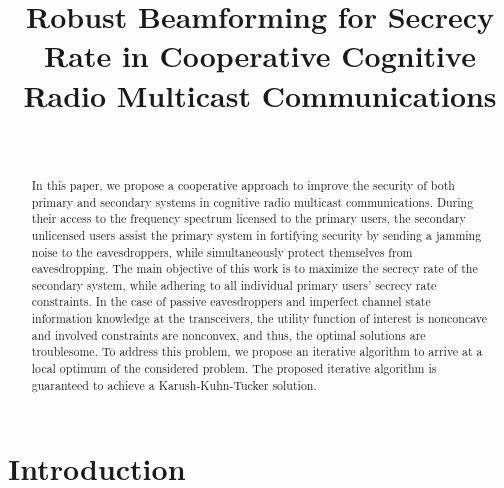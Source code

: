 \documentclass[journal,twoside]{IEEEtran}
\begin{document}
\title{ Robust Beamforming for Secrecy Rate in Cooperative Cognitive Radio Multicast Communications}
\author{
 \\

}
\maketitle
\thispagestyle{empty}
\pagestyle{empty} 
\vspace{-1.8cm}
\begin{abstract}
  In this paper, we propose a cooperative approach to improve the security of both primary and secondary systems in cognitive radio multicast communications. During their access to the frequency spectrum licensed to the primary  users, the secondary unlicensed users  assist the primary system in fortifying security by sending a jamming noise to the eavesdroppers, while  simultaneously protect themselves from eavesdropping.  The main objective of this work is to maximize the secrecy rate of the secondary system, while  adhering to all individual primary users' secrecy rate constraints.	In the case of passive eavesdroppers and imperfect channel state information  knowledge at the transceivers,  the utility function of interest is nonconcave and involved constraints are nonconvex, and thus, the optimal solutions are troublesome.  To address this problem, we propose an iterative algorithm to arrive at a local optimum of the considered problem. The proposed iterative algorithm is guaranteed to achieve a Karush-Kuhn-Tucker solution. 
\end{abstract}


\section{Introduction} \label{Introduction}
\end{document}
